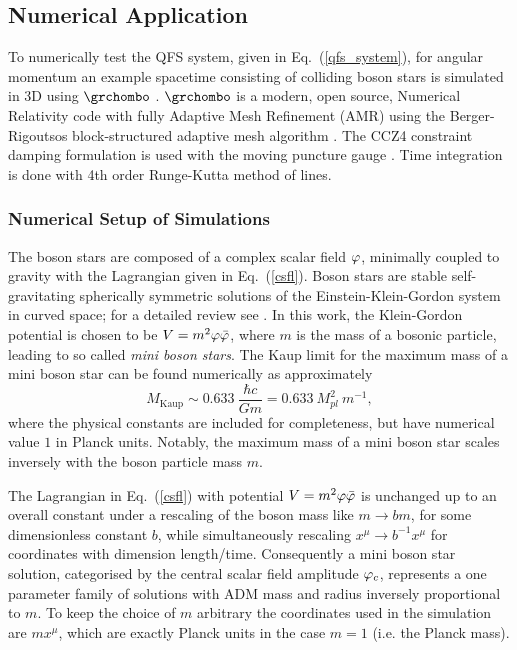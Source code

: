 \subsection{Numerical Application} \label{sect:results}
To numerically test the QFS system, given in Eq.~(\ref{qfs_system}), for angular momentum an example spacetime consisting of colliding boson stars is simulated in 3D using $\grchombo$ \cite{clough2015grchombo,Andrade2021}. $\grchombo$ is a modern, open source, Numerical Relativity code with fully Adaptive Mesh Refinement (AMR) using the Berger-Rigoutsos block-structured adaptive
mesh algorithm \cite{PhysRevD.67.104005}. The CCZ4 constraint damping formulation \cite{PhysRevD.67.104005,PhysRevD.85.064040} is used with the moving puncture gauge \cite{PhysRevLett.96.111101,PhysRevLett.96.111102}. Time integration is done with 4th order Runge-Kutta method of lines. 




\subsubsection{Numerical Setup of Simulations}

The boson stars are composed of a complex scalar field $\varphi$, minimally coupled to gravity with the Lagrangian given in Eq.~(\ref{csfl}). Boson stars are stable self-gravitating spherically symmetric solutions of the Einstein-Klein-Gordon system in curved space; for a detailed review see \cite{liebling2017dynamical}. In this work, the Klein-Gordon potential is chosen to be $V=m^2 \varphi \bar{\varphi}$, where $m$ is the mass of a bosonic particle, leading to so called {\it mini boson stars}. The Kaup limit for the maximum mass of a mini boson star can be found numerically as approximately 
\begin{equation} M_{\mathrm{Kaup}} \sim 0.633 ~\frac{\hbar c}{G m} = 0.633 ~M_{pl}^2 ~m^{-1}, \end{equation}
where the physical constants are included for completeness, but have numerical value $1$ in Planck units. Notably, the maximum mass of a mini boson star scales inversely with the boson particle mass $m$. 

The Lagrangian in Eq.~(\ref{csfl}) with potential $V=m^2 \varphi \bar{\varphi}$ is unchanged up to an overall constant under a rescaling of the boson mass like $m \rightarrow b m$, for some dimensionless constant $b$, while simultaneously rescaling $x^\mu \rightarrow b^{-1} x^\mu$ for coordinates with dimension length/time. Consequently a mini boson star solution, categorised by the central scalar field amplitude $\varphi_c$, represents a one parameter family of solutions with ADM mass and radius inversely proportional to $m$. To keep the choice of $m$ arbitrary the coordinates used in the simulation are $m x^\mu$, which are exactly Planck units in the case $m=1$ (i.e. the Planck mass).


